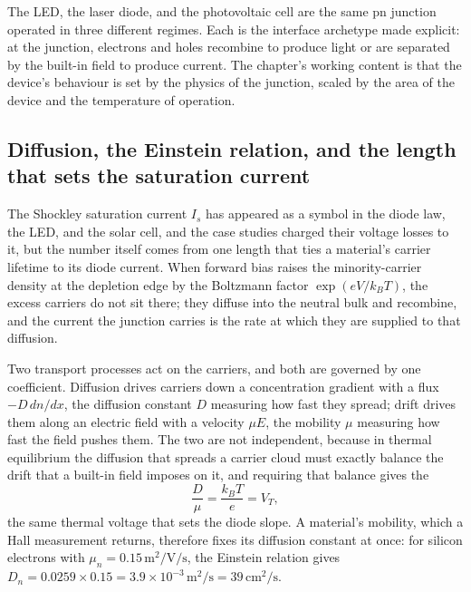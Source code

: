 

\begin{archetype}
The LED, the laser diode, and the photovoltaic cell are the same pn
junction operated in three different regimes. Each is the interface
archetype made explicit: at the junction, electrons and holes
recombine to produce light or are separated by the built-in field to
produce current. The chapter's working content is that the device's
behaviour is set by the physics of the junction, scaled by the area
of the device and the temperature of operation.
\end{archetype}

\subsection{Diffusion, the Einstein relation, and the length that sets the
saturation current}

The Shockley saturation current $I_s$ has appeared as a symbol in the diode
law, the LED, and the solar cell, and the case studies charged their voltage
losses to it, but the number itself comes from one length that ties a
material's carrier lifetime to its diode current. When forward bias raises
the minority-carrier density at the depletion edge by the Boltzmann factor
$\exp(eV/k_BT)$, the excess carriers do not sit there; they diffuse into the
neutral bulk and recombine, and the current the junction carries is the rate
at which they are supplied to that diffusion.

Two transport processes act on the carriers, and both are governed by one
coefficient. Diffusion drives carriers down a concentration gradient with a
flux $-D\,dn/dx$, the diffusion constant $D$ measuring how fast they spread;
drift drives them along an electric field with a velocity $\mu E$, the
mobility $\mu$ measuring how fast the field pushes them. The two are not
independent, because in thermal equilibrium the diffusion that spreads a
carrier cloud must exactly balance the drift that a built-in field imposes
on it, and requiring that balance gives the 
\[
\frac{D}{\mu} = \frac{k_BT}{e} = V_T,
\]
the same thermal voltage that sets the diode slope. A material's mobility,
which a Hall measurement returns, therefore fixes its diffusion constant at
once: for silicon electrons with $\mu_n = 0.15\,\si{\meter\squared\per\volt
\per\second}$, the Einstein relation gives $D_n = 0.0259\times 0.15 =
3.9\times 10^{-3}\,\si{\meter\squared\per\second} = 39\,\si{\centi\meter
\squared\per\second}$.

